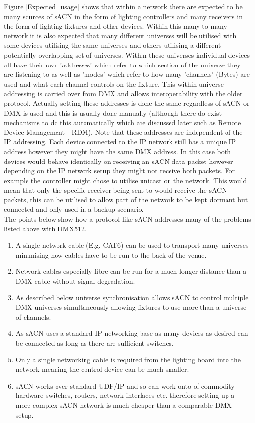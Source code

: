 \documentclass[11pt,a4paper]{article}
\begin{document}
Figure \ref{Expected_usage} shows that within a network there are expected to be many sources of sACN in the form of lighting controllers and many receivers in the form of lighting fixtures and other devices. Within this many to many network it is also expected that many different universes will be utilised with some devices utilising the same universes and others utilising a different potentially overlapping set of universes. Within these universes individual devices all have their own 'addresses' which refer to which section of the universe they are listening to as-well as 'modes' which refer to how many 'channels' (Bytes) are used and what each channel controls on the fixture. This within universe addressing is carried over from DMX and allows interoperability with the older protocol. Actually setting these addresses is done the same regardless of sACN or DMX is used and this is usually done manually (although there do exist mechanisms to do this automatically which are discussed later such as Remote Device Management - RDM). Note that these addresses are independent of the IP addressing. Each device connected to the IP network still has a unique IP address however they might have the same DMX address. In this case both devices would behave identically on receiving an sACN data packet however depending on the IP network setup they might not receive both packets. For example the controller might chose to utilise unicast on the network. This would mean that only the specific receiver being sent to would receive the sACN packets, this can be utilised to allow part of the network to be kept dormant but connected and only used in a backup scenario. \\

The points below show how a protocol like sACN addresses many of the problems listed above with DMX512.

\begin{enumerate}{}
	\item A single network cable (E.g. CAT6) can be used to transport many universes minimising how cables have to be run to the back of the venue.
	\item Network cables especially fibre can be run for a much longer distance than a DMX cable without signal degradation.
	\item As described below universe synchronisation allows sACN to control multiple DMX universes simultaneously allowing fixtures to use more than a universe of channels.
	\item As sACN uses a standard IP networking base as many devices as desired can be connected as long as there are sufficient switches.
	\item Only a single networking cable is required from the lighting board into the network meaning the control device can be much smaller.
	\item sACN works over standard UDP/IP and so can work onto of commodity hardware switches, routers, network interfaces etc. therefore setting up a more complex sACN network is much cheaper than a comparable DMX setup.
\end{enumerate}
\end{document}
